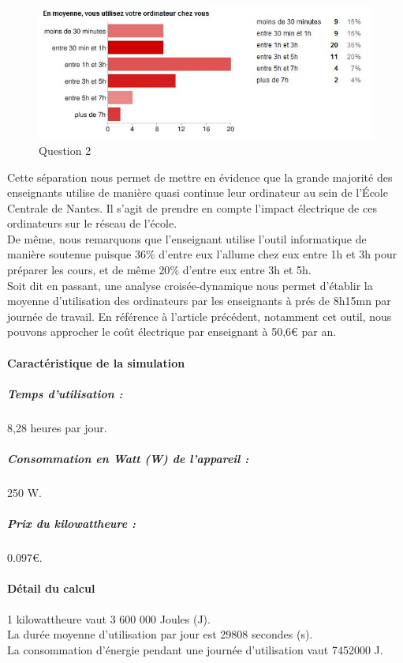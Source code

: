 \documentclass[a4paper,11pt,french]{article}
\begin{document}
\begin{figure}[h!]
\includegraphics[width=\textwidth]{i7.JPG}
\caption{Question 2}
\label{i7}
\end{figure}

Cette séparation nous permet de mettre en évidence que la grande majorité des enseignants utilise de manière quasi continue leur ordinateur au sein de l'École Centrale de Nantes. Il s'agit de prendre en compte l'impact électrique de ces ordinateurs sur le réseau de l'école.\\

De même, nous remarquons que l'enseignant utilise l'outil informatique de manière soutenue puisque $36\%$ d'entre eux l'allume chez eux entre 1h et 3h pour préparer les cours, et de même $20\%$ d'entre eux entre 3h et 5h.\\

Soit dit en passant, une analyse croisée-dynamique nous permet d'établir la moyenne d'utilisation des ordinateurs par les enseignants à prés de 8h15mn par journée de travail. En référence à l'article précédent, notamment cet outil, nous pouvons approcher le coût électrique par enseignant à 50,6\euro{} par an.\\

\paragraph{Caractéristique de la simulation}

\subparagraph{Temps d'utilisation :} 8,28 heures par jour.
\subparagraph{Consommation en Watt (W) de l'appareil :}250 W.
\subparagraph{Prix du kilowattheure :} 0.097\euro{}. 

\paragraph{Détail du calcul}

1 kilowattheure vaut 3 600 000 Joules (J).\\
La durée moyenne d'utilisation par jour est 29808 secondes (s).\\
La consommation d'énergie pendant une journée d'utilisation vaut 7452000 J.\\
\end{document}
